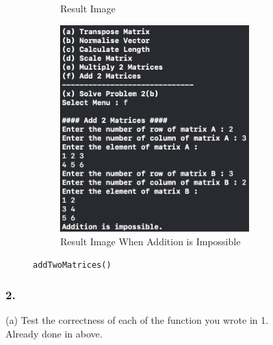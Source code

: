 \begin{figure}[h]
\begin{subfigure}[b]{0.45\textwidth}
        \caption{Result Image}
        \label{fig:image}
    \end{subfigure}
    \hfill
    \begin{subfigure}[b]{0.45\textwidth}
        \centering
        \includegraphics[height=8cm]{img/prj0/f-null.png}
        \caption{Result Image When Addition is Impossible}
        \label{fig:image}
    \end{subfigure}
    \caption{\texttt{addTwoMatrices()}}
\end{figure}
\pagebreak


\subsubsection{2.}
(a) Test the correctness of each of the function you wrote in 1.\\
Already done in above.\\

